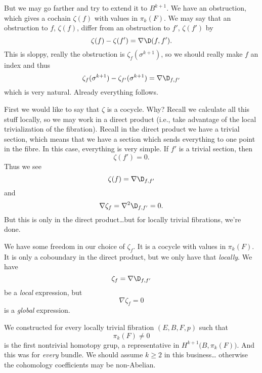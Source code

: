 But we may go farther and try to extend it to $B^{k+1}$. We have
an obstruction, which gives a cochain $\zeta(f)$ with values in
$\pi_{k}(F)$. We may say that an obstruction to $f$, $\zeta(f)$,
differ from an obstruction to $f'$, $\zeta(f')$ by
\begin{equation}
\zeta(f)-\zeta(f')=\nabla\D(f,f').
\end{equation}
This is sloppy, really the obstruction is
$\zeta_{f}(\sigma^{k+1})$, so we should really make $f$ an index
and thus
\begin{equation}
\zeta_{f}(\sigma^{k+1})-\zeta_{f'}(\sigma^{k+1})=\nabla\D_{f,f'}
\end{equation}
which is very natural. Already everything follows.

First we would like to say that $\zeta$ is a
cocycle. Why? Recall
we calculate all this stuff locally, so we may work in a direct
product (i.e., take advantage of the local trivialization of the
fibration). Recall in the direct product we have a trivial
section, which means that we have a section which sends
everything to one point in the fibre. In this case, everything is
very simple. If $f'$ is a trivial section, then 
\begin{equation}
\zeta(f')=0.
\end{equation}
Thus we see
\begin{equation}
\zeta(f)=\nabla\D_{f,f'}
\end{equation}
and
\begin{equation}
\nabla\zeta_{f}=\nabla^{2}\D_{f,f'}=0.
\end{equation}
But this is only in the direct product\dots but for locally
trivial fibrations, we're done.

We have some freedom in our choice of $\zeta_{f}$. It is a
cocycle with values in $\pi_{k}(F)$. It is only a coboundary in
the direct product, but we only have that \emph{locally}. We
have
\begin{equation}
\zeta_{f}=\nabla\D_{f,f'}
\end{equation}
be a \emph{local} expression, but 
\begin{equation}
\nabla\zeta_{f}=0
\end{equation}
is a \emph{global} expression.

We constructed for every locally trivial fibration $(E,B,F,p)$
such that
\begin{equation}
\pi_{k}(F)\not=0
\end{equation}
is the first nontrivial homotopy grup, a representative in
$H^{k+1}\bigl(B,\pi_{k}(F)\bigr)$. And this was for \emph{every}
bundle. We should assume $k\geq2$ in this business\dots
otherwise the cohomology coefficients may be non-Abelian.

